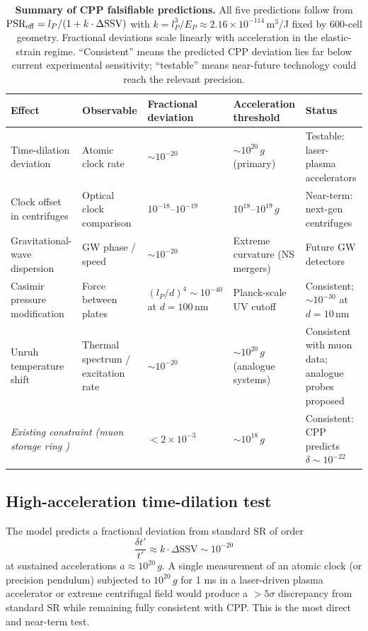 \documentclass[11pt,letterpaper]{article}
\begin{document}
\begin{table}[H]
\centering
\caption{%
  \textbf{Summary of CPP falsifiable predictions.}
  All five predictions follow from $\text{PSR}_{\rm eff} = l_P/(1+k\cdot\Delta\text{SSV})$
  with $k = l_P^3/E_P \approx 2.16\times10^{-114}$\,m$^3$/J fixed by
  600-cell geometry. Fractional deviations scale linearly with acceleration
  in the elastic-strain regime. ``Consistent'' means the predicted CPP
  deviation lies far below current experimental sensitivity; ``testable''
  means near-future technology could reach the relevant precision.
}
\label{tab:predictions}
\small
\begin{tabular}{p{3.2cm} p{2.4cm} p{2.4cm} p{2.6cm} p{2.8cm}}
\toprule
\textbf{Effect} &
\textbf{Observable} &
\textbf{Fractional deviation} &
\textbf{Acceleration threshold} &
\textbf{Status} \\
\midrule
Time-dilation deviation
  & Atomic clock rate
  & $\sim 10^{-20}$
  & $\sim 10^{20}\,g$ (primary)
  & Testable: laser-plasma accelerators \\[4pt]

Clock offset in centrifuges
  & Optical clock comparison
  & $10^{-18}$--$10^{-19}$
  & $10^{18}$--$10^{19}\,g$
  & Near-term: next-gen centrifuges \\[4pt]

Gravitational-wave dispersion
  & GW phase / speed
  & $\sim 10^{-20}$
  & Extreme curvature (NS mergers)
  & Future GW detectors \\[4pt]

Casimir pressure modification
  & Force between plates
  & $(l_P/d)^4 \sim 10^{-40}$ at $d=100\,$nm
  & Planck-scale UV cutoff
  & Consistent; $\sim 10^{-30}$ at $d=10\,$nm \\[4pt]

Unruh temperature shift
  & Thermal spectrum / excitation rate
  & $\sim 10^{-20}$
  & $\sim 10^{20}\,g$ (analogue systems)
  & Consistent with muon data; analogue probes proposed \\[4pt]

\midrule
\multicolumn{2}{l}{\textit{Existing constraint (muon storage ring \cite{bailey1977})}}
  & $< 2\times10^{-3}$
  & $\sim 10^{18}\,g$
  & Consistent: CPP predicts $\delta \sim 10^{-22}$ \\
\bottomrule
\end{tabular}
\end{table}

\subsection{High-acceleration time-dilation test} 
The model predicts a fractional deviation from standard SR of order
\[
\frac{\delta t'}{t'} \approx k \cdot \Delta\text{SSV} \sim 10^{-20}
\]
at sustained accelerations \(a \approx 10^{20}\,g\).  
A single measurement of an atomic clock (or precision pendulum) subjected to \(10^{20}\,g\) for 1 ms in a laser-driven plasma accelerator or extreme centrifugal field would produce a \(>5\sigma\) discrepancy from standard SR while remaining fully consistent with CPP. This is the most direct and near-term test.
\end{document}
